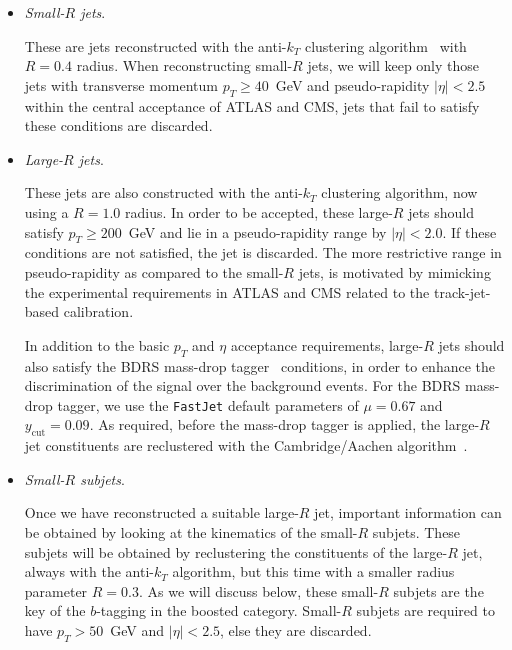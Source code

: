 \begin{itemize}
\item {\it Small-$R$ jets}.

  These are jets  reconstructed with the
  anti-$k_T$ clustering algorithm~\cite{Cacciari:2008gp} with $R=0.4$ radius.
  When reconstructing small-$R$ jets, we will keep only
  those jets with transverse momentum $p_T \ge 40$~GeV
  and pseudo-rapidity $|\eta|<2.5$ within the central
  acceptance of ATLAS and CMS, jets that fail to satisfy these
  conditions are discarded.
    

\item {\it Large-$R$ jets}.

  These jets are also constructed with the
  anti-$k_T$ clustering algorithm, now using a $R=1.0$ radius.
  In order to be accepted, these large-$R$ jets should
  satisfy  $p_T \ge 200$~GeV and lie in a pseudo-rapidity range by
  $|\eta|<2.0$.
  If these conditions are not satisfied, the jet is discarded.
  The more restrictive range  in pseudo-rapidity
  as compared to the small-$R$ jets,
  is motivated by mimicking the  experimental requirements
  in ATLAS and CMS
  related to the track-jet-based calibration.

  In addition to the basic $p_T$ and $\eta$
  acceptance requirements, large-$R$ jets should also
  satisfy the  BDRS mass-drop tagger~\cite{Butterworth:2008iy}
  conditions, in order
  to enhance the discrimination of the signal over the background
  events.
  For the BDRS mass-drop tagger, we use the {\tt FastJet} default
  parameters of  $\mu = 0.67$ and $y_{\textrm{cut}}= 0.09$.
  As required, before the mass-drop tagger is applied, the large-$R$ jet
  constituents are reclustered with the Cambridge/Aachen
  algorithm~\cite{Dokshitzer:1997in,Wobisch:1998wt}.


  
\item {\it Small-$R$ subjets}.

  Once we have reconstructed a suitable large-$R$ jet, important
  information can be obtained by looking at the kinematics of
  the small-$R$ subjets.
  These subjets will be obtained by reclustering the constituents
  of the large-$R$ jet, always with the  anti-$k_T$ algorithm,
  but this time with a smaller radius parameter $R=0.3$.
  As we will discuss below, these small-$R$ subjets are the key of
  the $b$-tagging in the boosted category.
  Small-$R$ subjets are required to have $p_T > 50$~GeV and $|\eta|<2.5$,
  else they are discarded.

  \end{itemize}



